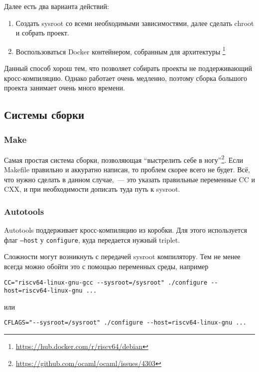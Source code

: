 Далее есть два варианта действий:
\begin{enumerate}
	\item Создать sysroot со всеми необходимыми зависимостями, далее сделать chroot и собрать проект.
	\item Воспользоваться Docker контейнером, собранным для архитектуры \riscv{}\footnote{\url{https://hub.docker.com/r/riscv64/debian}}
\end{enumerate}

Данный способ хорош тем, что позволяет собирать проекты не поддерживающий кросс-компиляцию.
Однако \qemu{} работает очень медленно, поэтому сборка большого проекта занимает очень много времени.

\subsection{Системы сборки}
\label{subsec:build_systems}

\subsubsection{Make}

Самая простая система сборки, позволяющая \enquote{выстрелить себе в ногу}\footnote{\url{https://github.com/ocaml/ocaml/issues/4303}}.
Если Makefile правильно и аккуратно написан, то проблем скорее всего не будет.
Всё, что нужно сделать в данном случае,~--- это указать правильные переменные CC и CXX, и при необходимости дописать туда путь к sysroot.

\subsubsection{Autotools}
Autotools поддерживает кросс-компиляцию из коробки.
Для этого используется флаг \texttt{--host} у \texttt{configure}, куда передается нужный triplet.

Сложности могут возникнуть с передачей sysroot компилятору.
Тем не менее всегда можно обойти это с помощью переменных среды, например
\begin{verbatim}
CC="riscv64-linux-gnu-gcc --sysroot=/sysroot" ./configure --host=riscv64-linux-gnu ...
\end{verbatim}
или
\begin{verbatim}
CFLAGS="--sysroot=/sysroot" ./configure --host=riscv64-linux-gnu ...
\end{verbatim}

